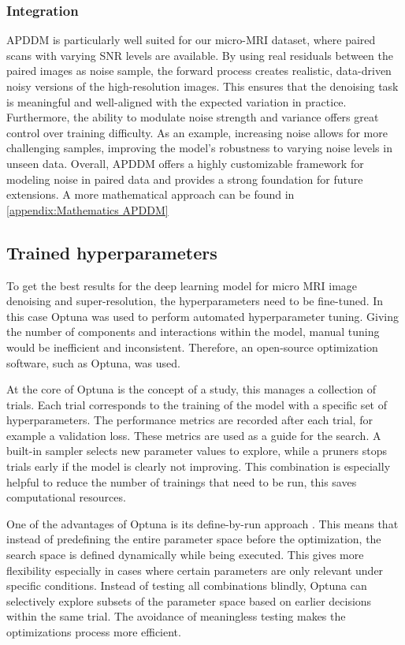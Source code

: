 \documentclass[twocolumn]{article}
\begin{document}
\subsubsection{Integration}
APDDM is particularly well suited for our micro-MRI dataset, where paired scans with varying SNR levels are available. By using real residuals between the paired images as noise sample, the forward process creates realistic, data-driven noisy versions of the high-resolution images. This ensures that the denoising task is meaningful and well-aligned with the expected variation in practice. 
Furthermore, the ability to modulate noise strength and variance offers great control over training difficulty. As an example, increasing noise allows for more challenging samples, improving the model's robustness to varying noise levels in unseen data. Overall, APDDM offers a highly customizable framework for modeling noise in paired data and provides a strong foundation for future extensions. A more mathematical approach can be found in \ref{appendix:Mathematics APDDM}

\subsection{Trained hyperparameters}

To get the best results for the deep learning model for micro MRI image denoising and super-resolution, the hyperparameters need to be fine-tuned. In this case Optuna was used to perform automated hyperparameter tuning. Giving the number of components and interactions within the model, manual tuning would be inefficient and inconsistent. Therefore, an open-source optimization software, such as Optuna, was used. 

At the core of Optuna is the concept of a study, this manages a collection of trials. Each trial corresponds to the training of the model with a specific set of hyperparameters. The performance metrics are recorded after each trial, for example a validation loss. These metrics are used as a guide for the search. A built-in sampler selects new parameter values to explore, while a pruners stops trials early if the model is clearly not improving. This combination is especially helpful to reduce the number of trainings that need to be run, this saves computational resources. 

One of the advantages of Optuna is its define-by-run approach \cite{10.1145/3292500.3330701}. This means that instead of predefining the entire parameter space before the optimization, the search space is defined dynamically while being executed. This gives more flexibility especially in cases where certain parameters are only relevant under specific conditions. Instead of testing all combinations blindly, Optuna can selectively explore subsets of the parameter space based on earlier decisions within the same trial. The avoidance of meaningless testing makes the optimizations process  more efficient. 
\end{document}
